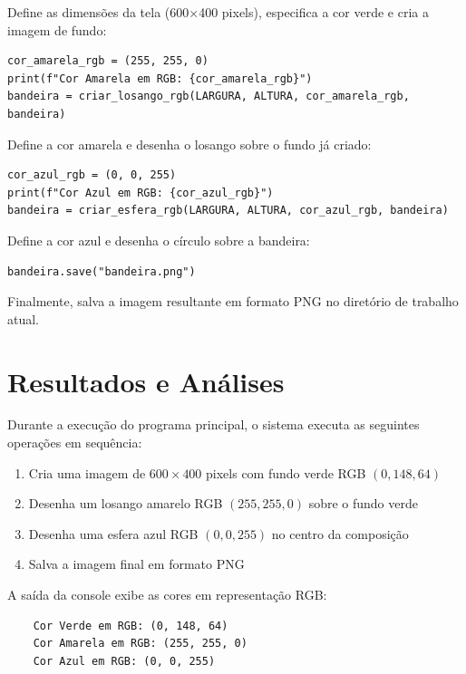\documentclass{article}
\begin{document}
Define as dimensões da tela (600×400 pixels), especifica a cor verde e cria a imagem de fundo:

\begin{lstlisting}[style=pythonstyle]
cor_amarela_rgb = (255, 255, 0)
print(f"Cor Amarela em RGB: {cor_amarela_rgb}")
bandeira = criar_losango_rgb(LARGURA, ALTURA, cor_amarela_rgb, bandeira)
\end{lstlisting}

Define a cor amarela e desenha o losango sobre o fundo já criado:

\begin{lstlisting}[style=pythonstyle]
cor_azul_rgb = (0, 0, 255)
print(f"Cor Azul em RGB: {cor_azul_rgb}")
bandeira = criar_esfera_rgb(LARGURA, ALTURA, cor_azul_rgb, bandeira)
\end{lstlisting}

Define a cor azul e desenha o círculo sobre a bandeira:

\begin{lstlisting}[style=pythonstyle]
bandeira.save("bandeira.png")
\end{lstlisting}

Finalmente, salva a imagem resultante em formato PNG no diretório de trabalho atual.

\section{Resultados e Análises}

Durante a execução do programa principal, o sistema executa as seguintes operações em sequência:

\begin{enumerate}
    \item Cria uma imagem de $600 \times 400$ pixels com fundo verde RGB $(0, 148, 64)$
    \item Desenha um losango amarelo RGB $(255, 255, 0)$ sobre o fundo verde
    \item Desenha uma esfera azul RGB $(0, 0, 255)$ no centro da composição
    \item Salva a imagem final em formato PNG
\end{enumerate}

A saída da console exibe as cores em representação RGB:

\begin{verbatim}
    Cor Verde em RGB: (0, 148, 64)
    Cor Amarela em RGB: (255, 255, 0)
    Cor Azul em RGB: (0, 0, 255)
\end{verbatim}
\end{document}
